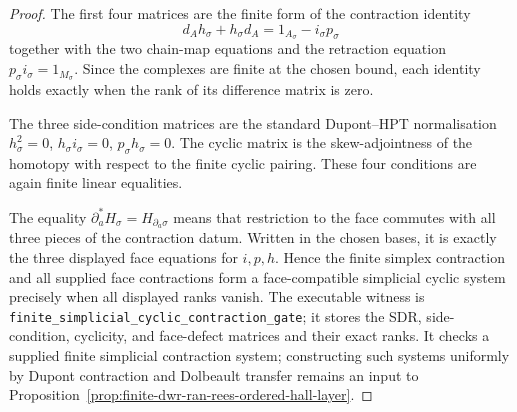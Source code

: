 \begin{proof}
The first four matrices are the finite form of the contraction identity
\[
d_Ah_\sigma+h_\sigma d_A
=
1_{A_\sigma}-i_\sigma p_\sigma
\]
together with the two chain-map equations and the retraction equation
\(p_\sigma i_\sigma=1_{M_\sigma}\). Since the complexes are finite at
the chosen bound, each identity holds exactly when the rank of its
difference matrix is zero.

The three side-condition matrices are the standard Dupont--HPT
normalisation \(h_\sigma^2=0\), \(h_\sigma i_\sigma=0\),
\(p_\sigma h_\sigma=0\). The cyclic matrix is the skew-adjointness of
the homotopy with respect to the finite cyclic pairing. These four
conditions are again finite linear equalities.

The equality \(\partial_a^*H_\sigma=H_{\partial_a\sigma}\) means that
restriction to the face commutes with all three pieces of the
contraction datum. Written in the chosen bases, it is exactly the three
displayed face equations for \(i,p,h\). Hence the finite simplex
contraction and all supplied face contractions form a face-compatible
simplicial cyclic system precisely when all displayed ranks vanish. The
executable witness is
\texttt{finite\_simplicial\_cyclic\_contraction\_gate}; it stores the
SDR, side-condition, cyclicity, and face-defect matrices and their
exact ranks. It checks a supplied finite simplicial contraction system;
constructing such systems uniformly by Dupont contraction and Dolbeault
transfer remains an input to
Proposition~\ref{prop:finite-dwr-ran-rees-ordered-hall-layer}.
\end{proof}


